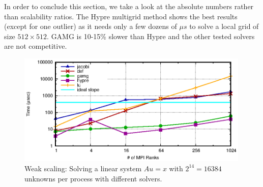In order to conclude this section, we take a look at the absolute numbers rather than scalability ratios. The Hypre multigrid method shows the best results (except for one outlier) as it needs only a few dozens of $\mu s$ to solve a local grid of size $512\times 512$. GAMG is  10-15\% slower than Hypre and the other tested solvers are not competitive.

\begin{figure}[tb]
	\centering
	\includegraphics[width=0.99\textwidth]{ex2_weak_nomaxit}
	\caption{Weak scaling: Solving a linear system $Au = x$ with $2^{14} = 16384$ unknowns per process with different solvers. } 
	\label{fig:ex2_weak_nomaxit}
\end{figure}
